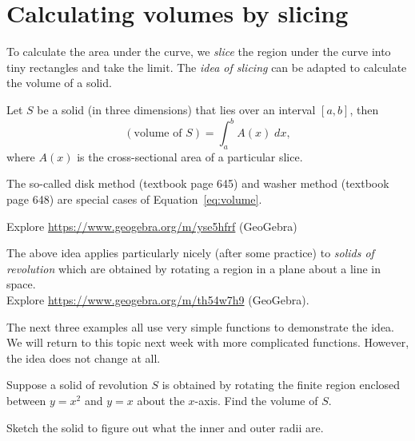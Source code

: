 \documentclass[../main.tex]{subfiles}
\begin{document}
 \section{Calculating volumes by slicing}
To calculate the area under the curve, we \emph{slice} the region under the curve into tiny rectangles and take the limit. The \emph{idea of slicing} can be adapted to calculate the volume of a solid.

\begin{thm}
  Let \(S\) be a solid (in three dimensions) that lies over an interval \([a,b]\), then
  \begin{equation} \label{eq:volume}
    (\text{volume of } S) = \int_{a}^{b} A(x) \;dx,
  \end{equation}
  where \(A(x)\) is the cross-sectional area of a particular slice. 

  The so-called disk method (textbook page 645) and washer method (textbook page 648) are special cases of Equation~\eqref{eq:volume}.
\end{thm}

{\footnotesize Explore \url{https://www.geogebra.org/m/yse5hfrf} (GeoGebra)}



The above idea applies particularly nicely (after some practice) to \emph{solids of revolution} which are obtained by rotating a region in a plane about a line in space.  \\
{\footnotesize Explore \url{https://www.geogebra.org/m/th54w7h9} (GeoGebra).}

\clearpage


The next three examples all use very simple functions to demonstrate the idea. We will return to this topic next week with more complicated functions. However, the idea does not change at all.

\begin{example}
  Suppose a solid of revolution \(S\) is obtained by rotating the finite region enclosed between \(y = x^{2}\) and \(y = x\) about the \(x\)-axis. Find the volume of \(S\).


  Sketch the solid to figure out what the inner and outer radii are.

  

\end{example}
\clearpage
\end{document}
